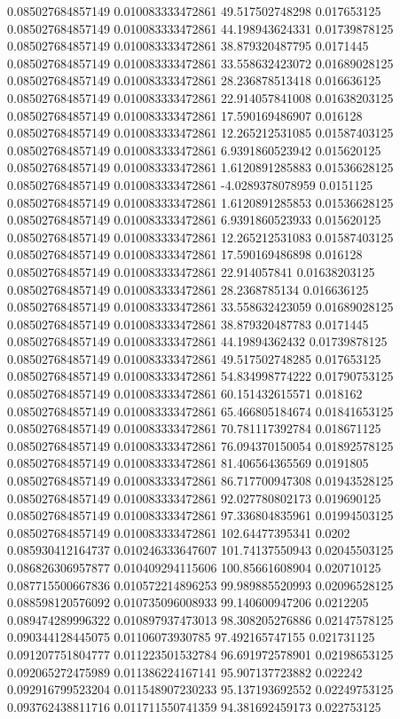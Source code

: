0.085027684857149 0.010083333472861 49.517502748298 0.017653125
0.085027684857149 0.010083333472861 44.198943624331 0.01739878125
0.085027684857149 0.010083333472861 38.879320487795 0.0171445
0.085027684857149 0.010083333472861 33.558632423072 0.01689028125
0.085027684857149 0.010083333472861 28.236878513418 0.016636125
0.085027684857149 0.010083333472861 22.914057841008 0.01638203125
0.085027684857149 0.010083333472861 17.590169486907 0.016128
0.085027684857149 0.010083333472861 12.265212531085 0.01587403125
0.085027684857149 0.010083333472861 6.9391860523942 0.015620125
0.085027684857149 0.010083333472861 1.6120891285883 0.01536628125
0.085027684857149 0.010083333472861 -4.0289378078959 0.0151125
0.085027684857149 0.010083333472861 1.6120891285853 0.01536628125
0.085027684857149 0.010083333472861 6.9391860523933 0.015620125
0.085027684857149 0.010083333472861 12.265212531083 0.01587403125
0.085027684857149 0.010083333472861 17.590169486898 0.016128
0.085027684857149 0.010083333472861 22.914057841 0.01638203125
0.085027684857149 0.010083333472861 28.2368785134 0.016636125
0.085027684857149 0.010083333472861 33.558632423059 0.01689028125
0.085027684857149 0.010083333472861 38.879320487783 0.0171445
0.085027684857149 0.010083333472861 44.19894362432 0.01739878125
0.085027684857149 0.010083333472861 49.517502748285 0.017653125
0.085027684857149 0.010083333472861 54.834998774222 0.01790753125
0.085027684857149 0.010083333472861 60.151432615571 0.018162
0.085027684857149 0.010083333472861 65.466805184674 0.01841653125
0.085027684857149 0.010083333472861 70.781117392784 0.018671125
0.085027684857149 0.010083333472861 76.094370150054 0.01892578125
0.085027684857149 0.010083333472861 81.406564365569 0.0191805
0.085027684857149 0.010083333472861 86.717700947308 0.01943528125
0.085027684857149 0.010083333472861 92.027780802173 0.019690125
0.085027684857149 0.010083333472861 97.336804835961 0.01994503125
0.085027684857149 0.010083333472861 102.64477395341 0.0202
0.085930412164737 0.010246333647607 101.74137550943 0.02045503125
0.086826306957877 0.010409294115606 100.85661608904 0.020710125
0.087715500667836 0.010572214896253 99.989885520993 0.02096528125
0.088598120576092 0.010735096008933 99.140600947206 0.0212205
0.089474289996322 0.010897937473013 98.308205276886 0.02147578125
0.090344128445075 0.01106073930785 97.492165747155 0.021731125
0.091207751804777 0.011223501532784 96.691972578901 0.02198653125
0.092065272475989 0.011386224167141 95.907137723882 0.022242
0.092916799523204 0.011548907230233 95.137193692552 0.02249753125
0.093762438811716 0.011711550741359 94.381692459173 0.022753125
